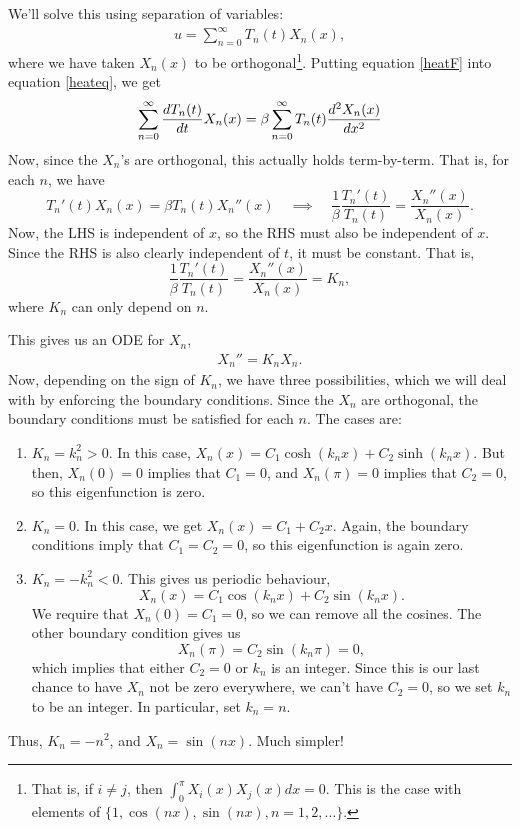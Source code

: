 \documentclass[12pt]{book}
\begin{document}
We'll solve this using separation of variables:
\begin{eqnarray}
  \label{heatF}
  u = \sum_{n=0}^\infty T_n(t) X_n(x),
\end{eqnarray}
where we have taken $X_n(x)$ to be orthogonal\footnote{That is, if
  $i\neq j$, then $\int_0^\pi X_i(x) X_j(x) dx =0.$ This is the case
  with elements of $\{1,\cos(nx),\sin(nx),n=1,2,\dots \}$.}.  Putting
equation \eqref{heatF} into equation \eqref{heateq}, we get
\begin{eqnarray}
  \label{heats}
  \sum_{n=0}^\infty \frac{dT_n(t)}{dt}X_n(x)
  =\beta\sum_{n=0}^\infty T_n(t)\frac{d^2 X_n(x)}{d x^2}
\end{eqnarray}
Now, since the $X_n$'s are orthogonal, this actually holds term-by-term. That
is, for each $n$, we have
\begin{dmath*}[compact]
  T_n'(t)X_n(x) = \beta  T_n(t)X_n''(x)
  \quad \implies \quad
  \frac{1}{\beta}\frac{T_n'(t)}{T_n(t)}= \frac{X_n''(x)}{X_n(x)}.
\end{dmath*}
Now, the LHS is independent of $x$, so the RHS must also be independent of $x$.
Since the RHS is also clearly independent of $t$, it must be constant. That is,
\begin{dmath*}[compact]
  \frac{1}{\beta}\frac{T_n'(t)}{T_n(t)}
  = \frac{X_n''(x)}{X_n(x)} 
  = K_n,
\end{dmath*}
where $K_n$ can only depend on $n$.

This gives us an ODE for $X_n$,
\begin{eqnarray}
  \label{Eigenfunction}
  X_n'' = K_n X_n.
\end{eqnarray}
Now, depending on the sign of $K_n$, we have three possibilities, which we will
deal with by enforcing the boundary conditions. Since the $X_n$ are orthogonal,
the boundary conditions must be satisfied for each $n$. The cases are:
\begin{enumerate}
  \item $K_n=k_n^2 > 0$. In this case, $X_n(x)= C_1 \cosh(k_n x) +C_2
    \sinh(k_n x)$.  But then, $X_n(0)=0$ implies that $C_1=0$, and
    $X_n(\pi)=0$ implies that $C_2=0$, so this eigenfunction is zero.
  \item $K_n = 0$. In this case, we get $X_n(x)=C_1 +C_2 x$. Again,
    the boundary conditions imply that $C_1=C_2=0$, so this
    eigenfunction is again zero.
  \item $K_n =-k_n^2 < 0$. This gives us periodic behaviour,
    \begin{dmath*}
      X_n(x)=C_1\cos(k_nx) + C_2\sin(k_nx).
    \end{dmath*}
    We require that $X_n(0)=C_1=0$, so we can remove all the cosines. The
    other boundary condition gives us
    \begin{dmath*}[compact]
      X_n(\pi)=C_2\sin(k_n\pi)=0,
    \end{dmath*}
    which implies that either $C_2=0$ or $k_n$ is an integer. Since this is
    our last chance to have $X_n$ not be zero everywhere, we can't have $C_2=0$,
    so we set $k_n$ to be an integer. In particular, set $k_n=n$.
\end{enumerate}
Thus, $K_n=-n^2$, and $X_n= \sin(nx)$. Much simpler!
\end{document}
